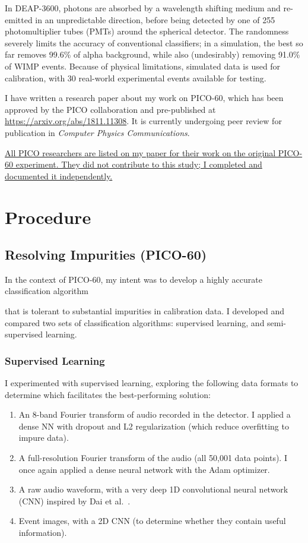 \documentclass[12pt]{article}
\begin{document}
In DEAP-3600, photons are absorbed by a wavelength shifting medium and re-emitted in an unpredictable direction, before being detected by one of 255 photomultiplier tubes (PMTs) around the spherical detector. The randomness severely limits the accuracy of conventional classifiers; in a simulation, the best so far removes 99.6\% of alpha background, while also (undesirably) removing 91.0\% of WIMP events. Because of physical limitations, simulated data is used for calibration, with 30 real-world experimental events available for testing.

I have written a research paper \cite{me} about my work on PICO-60, which has been approved by the PICO collaboration and pre-published at \url{https://arxiv.org/abs/1811.11308}. It is currently undergoing peer review for publication in \textit{Computer Physics Communications}.

\ul{All PICO researchers are listed on my paper for their work on the original PICO-60 experiment. They did not contribute to this study; I completed and documented it independently.}

\section{Procedure}

\subsection{Resolving Impurities (PICO-60)}

In the context of PICO-60, my intent was to develop a highly accurate classification algorithm

that is tolerant to substantial impurities in calibration data. I developed and compared two sets of classification algorithms: supervised learning, and semi-supervised learning.

\subsubsection{Supervised Learning}

I experimented with supervised learning, exploring the following data formats to determine which facilitates the best-performing solution:

\begin{enumerate}
    \item An 8-band Fourier transform of audio recorded in the detector. I applied a dense NN with dropout \cite{dropout} and L2 regularization (which reduce overfitting to impure data).
    \item A full-resolution Fourier transform of the audio (all 50,001 data points). I once again applied a dense neural network with the Adam \cite{adam} optimizer.
    \item A raw audio waveform, with a very deep 1D convolutional neural network (CNN) inspired by Dai et al.\ \cite{verydeepconvnets}.
    \item Event images, with a 2D CNN (to determine whether they contain useful information).
\end{enumerate}
\end{document}
